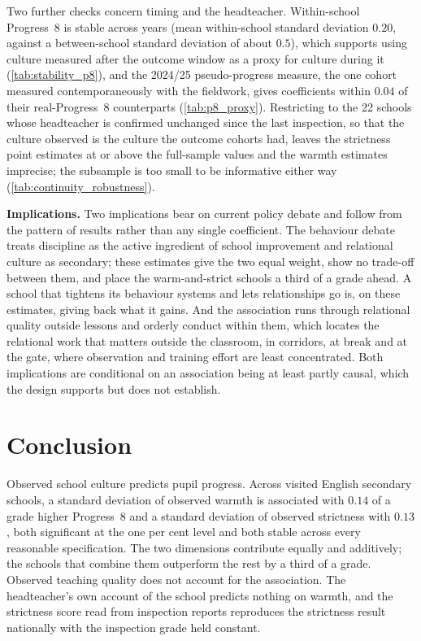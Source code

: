 Two further checks concern timing and the headteacher. Within-school
Progress~8 is stable across years (mean within-school standard deviation
$0.20$, against a between-school standard deviation of about $0.5$), which
supports using culture measured after the outcome window as a proxy for
culture during it (\cref{tab:stability_p8}), and the 2024/25 pseudo-progress
measure, the one cohort measured contemporaneously with the fieldwork, gives
coefficients within $0.04$ of their real-Progress~8 counterparts
(\cref{tab:p8_proxy}). Restricting to the 22 schools whose headteacher is
confirmed unchanged since the last inspection, so that the culture observed
is the culture the outcome cohorts had, leaves the strictness point estimates
at or above the full-sample values and the warmth estimates imprecise; the
subsample is too small to be informative either way
(\cref{tab:continuity_robustness}).



\textbf{Implications.} Two implications bear on current policy debate and
follow from the pattern of results rather than any single coefficient. The
behaviour debate treats discipline as the active ingredient of school
improvement and relational culture as secondary; these estimates give the two
equal weight, show no trade-off between them, and place the warm-and-strict
schools a third of a grade ahead. A school that tightens its behaviour
systems and lets relationships go is, on these estimates, giving back what it
gains. And the association runs through relational quality outside lessons
and orderly conduct within them, which locates the relational work that
matters outside the classroom, in corridors, at break and at the gate, where
observation and training effort are least concentrated. Both implications
are conditional on an association being at least partly causal, which the
design supports but does not establish.

\section{Conclusion}
\label{sec:p2_conclusion}

Observed school culture predicts pupil progress. Across \NTierOne{} visited
English secondary schools, a standard deviation of observed warmth is
associated with $0.14$ of a grade higher Progress~8 and a standard deviation
of observed strictness with $0.13$, both significant at the one per cent
level and both stable across every reasonable specification. The two
dimensions contribute equally and additively; the schools that combine them
outperform the rest by a third of a grade. Observed teaching quality does not
account for the association. The headteacher's own account of the school
predicts nothing on warmth, and the strictness score read from inspection
reports reproduces the strictness result nationally with the inspection grade
held constant.

